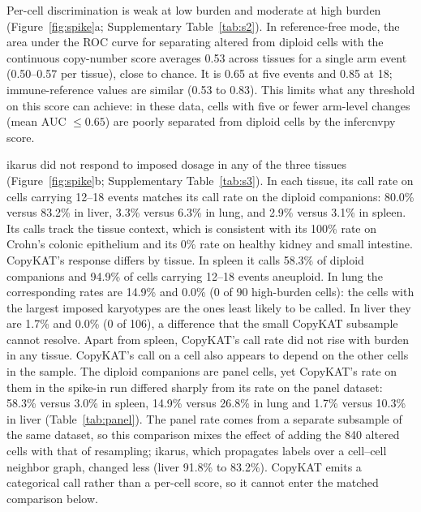 \documentclass[11pt,letterpaper]{article}
\begin{document}
Per-cell discrimination is weak at low burden and moderate at high burden (Figure~\ref{fig:spike}a; Supplementary Table~\ref{tab:s2}). In reference-free mode, the area under the ROC curve for separating altered from diploid cells with the continuous copy-number score averages 0.53 across tissues for a single arm event (0.50--0.57 per tissue), close to chance. It is 0.65 at five events and 0.85 at 18; immune-reference values are similar (0.53 to 0.83). This limits what any threshold on this score can achieve: in these data, cells with five or fewer arm-level changes (mean AUC $\le 0.65$) are poorly separated from diploid cells by the infercnvpy score.

ikarus did not respond to imposed dosage in any of the three tissues (Figure~\ref{fig:spike}b; Supplementary Table~\ref{tab:s3}). In each tissue, its call rate on cells carrying 12--18 events matches its call rate on the diploid companions: 80.0\% versus 83.2\% in liver, 3.3\% versus 6.3\% in lung, and 2.9\% versus 3.1\% in spleen. Its calls track the tissue context, which is consistent with its 100\% rate on Crohn's colonic epithelium and its 0\% rate on healthy kidney and small intestine. CopyKAT's response differs by tissue. In spleen it calls 58.3\% of diploid companions and 94.9\% of cells carrying 12--18 events aneuploid. In lung the corresponding rates are 14.9\% and 0.0\% (0 of 90 high-burden cells): the cells with the largest imposed karyotypes are the ones least likely to be called. In liver they are 1.7\% and 0.0\% (0 of 106), a difference that the small CopyKAT subsample cannot resolve. Apart from spleen, CopyKAT's call rate did not rise with burden in any tissue. CopyKAT's call on a cell also appears to depend on the other cells in the sample. The diploid companions are panel cells, yet CopyKAT's rate on them in the spike-in run differed sharply from its rate on the panel dataset: 58.3\% versus 3.0\% in spleen, 14.9\% versus 26.8\% in lung and 1.7\% versus 10.3\% in liver (Table~\ref{tab:panel}). The panel rate comes from a separate subsample of the same dataset, so this comparison mixes the effect of adding the 840 altered cells with that of resampling; ikarus, which propagates labels over a cell--cell neighbor graph, changed less (liver 91.8\% to 83.2\%). CopyKAT emits a categorical call rather than a per-cell score, so it cannot enter the matched comparison below.
\end{document}
